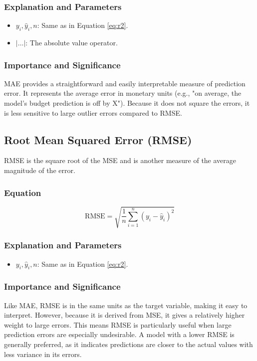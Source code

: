 \documentclass[12pt, a4paper]{article}
\begin{document}
\subsubsection{Explanation and Parameters}
\begin{itemize}
    \item \textbf{$y_i, \hat{y}_i, n$}: Same as in Equation \ref{eq:r2}.
    \item \textbf{$|\dots|$}: The absolute value operator.
\end{itemize}

\subsubsection{Importance and Significance}
MAE provides a straightforward and easily interpretable measure of prediction error. It represents the average error in monetary units (e.g., "on average, the model's budget prediction is off by \textsterling X"). Because it does not square the errors, it is less sensitive to large outlier errors compared to RMSE.

\subsection{Root Mean Squared Error (RMSE)}
RMSE is the square root of the MSE and is another measure of the average magnitude of the error.

\subsubsection{Equation}
\begin{equation}
\text{RMSE} = \sqrt{\frac{1}{n} \sum_{i=1}^{n} (y_i - \hat{y}_i)^2}
\label{eq:rmse}
\end{equation}

\subsubsection{Explanation and Parameters}
\begin{itemize}
    \item \textbf{$y_i, \hat{y}_i, n$}: Same as in Equation \ref{eq:r2}.
\end{itemize}

\subsubsection{Importance and Significance}
Like MAE, RMSE is in the same units as the target variable, making it easy to interpret. However, because it is derived from MSE, it gives a relatively higher weight to large errors. This means RMSE is particularly useful when large prediction errors are especially undesirable. A model with a lower RMSE is generally preferred, as it indicates predictions are closer to the actual values with less variance in its errors.
\end{document}
